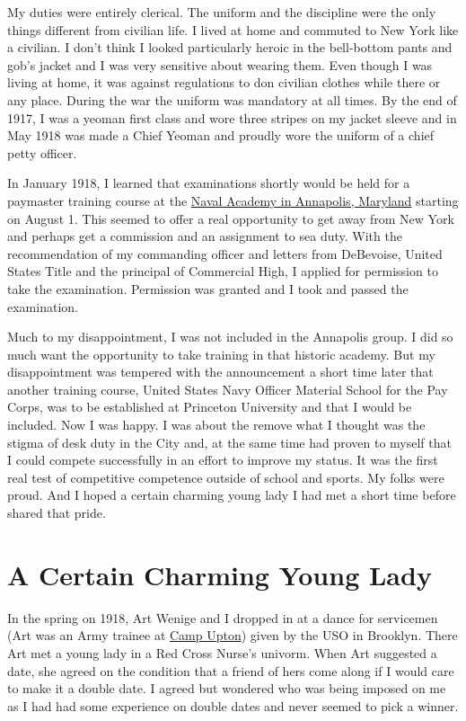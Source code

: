 \documentclass[12pt]{book}              %
\begin{document}
My duties were entirely clerical. The uniform and the discipline were the only things different from civilian life. I lived at home and commuted to New York like a civilian. I don't think I looked particularly heroic in the bell-bottom pants and gob's jacket and I was very sensitive about wearing them. Even though I was living at home, it was against regulations to don civilian clothes while there or any place. During the war the uniform was mandatory at all times. By the end of 1917, I was a yeoman first class and wore three stripes on my jacket sleeve and in May 1918 was made a Chief Yeoman and proudly wore the uniform of a chief petty officer. 

In January 1918, I learned that examinations shortly would be held for a paymaster training course at the \href{http://en.wikipedia.org/wiki/United_States_Naval_Academy}{Naval Academy in Annapolis, Maryland} starting on August 1. This seemed to offer a real opportunity to get away from New York and perhaps get a commission and an assignment to sea duty. With the recommendation of my commanding officer and letters from DeBevoise, United States Title and the principal of Commercial High, I applied for permission to take the examination. Permission was granted and I took and passed the examination.

Much to my disappointment, I was not included in the Annapolis group. I did so much want the opportunity to take training in that historic academy. But my disappointment was tempered with the announcement a short time later that another training course, United States Navy Officer Material School for the Pay Corps, was to be established at Princeton University and that I would be included. Now I was happy. I was about the remove what I thought was the stigma of desk duty in the City and, at the same time had proven to myself that I could compete successfully in an effort to improve my status. It was the first real test of competitive competence outside of school and sports. My folks were proud. And I hoped a certain charming young lady I had met a short time before shared that pride. 

\chapter{A Certain Charming Young Lady}

In the spring on 1918, Art Wenige and I dropped in at a dance for servicemen (Art was an Army trainee at \href{http://en.wikipedia.org/wiki/Camp_Upton}{Camp Upton}) given by the USO in Brooklyn. There Art met a young lady in a Red Cross Nurse's univorm. When Art suggested a date, she agreed on the condition that a friend of hers come along if I would care to make it a double date. I agreed but wondered who was being imposed on me as I had had some experience on double dates and never seemed to pick a winner. 
\end{document}
